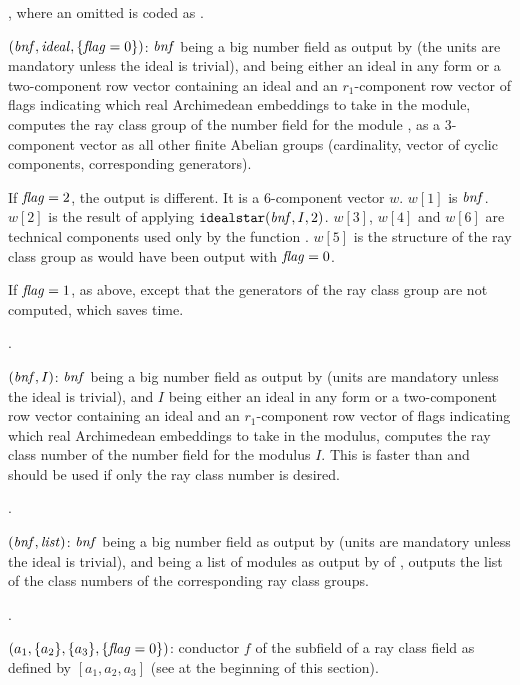 , where an omitted
 is coded as .

$(\hbox{\it bnf\/},\hbox{\it ideal\/},\{\hbox{\it f\kern0pt lag\/}=0\})$:
$\hbox{\it bnf\/}$ being a big number field
as output by  (the units are mandatory unless the ideal is
trivial), and  being either an ideal in any form or a two-component
row vector containing an ideal and an $r_1$-component row vector of flags
indicating which real Archimedean embeddings to take in the module, computes
the ray class group of the number field for the module , as a
3-component vector as all other finite Abelian groups (cardinality, vector of
cyclic components, corresponding generators).

If $\hbox{\it f\kern0pt lag\/}=2$, the output is different. It is a 6-component vector $w$. $w[1]$
is $\hbox{\it bnf\/}$. $w[2]$ is the result of applying
${\tt idealstar}(\hbox{\it bnf\/},I,2)$. $w[3]$, $w[4]$ and $w[6]$ are technical
components used only by the function . $w[5]$ is the
structure of the ray class group as would have been output with $\hbox{\it f\kern0pt lag\/}=0$.

If $\hbox{\it f\kern0pt lag\/}=1$, as above, except that the generators of the ray class group are
not computed, which saves time.

.

$(\hbox{\it bnf\/},I)$: $\hbox{\it bnf\/}$ being a big number field
as output
by  (units are mandatory unless the ideal is trivial), and $I$
being either an ideal in any form or a two-component row vector containing an
ideal and an $r_1$-component row vector of flags indicating which real
Archimedean embeddings to take in the modulus, computes the ray class number
of the number field for the modulus $I$. This is faster than 
and should be used if only the ray class number is desired.

.

$(\hbox{\it bnf\/},\hbox{\it list\/})$: $\hbox{\it bnf\/}$ being a
big number field as output by  (units are mandatory unless
the ideal is trivial), and  being a list of modules as output
by  of ,
outputs the list of the class numbers of the corresponding ray class groups.

.

$(a_1,\{a_2\},\{a_3\}, \{\hbox{\it f\kern0pt lag\/}=0\})$: conductor $f$ of
the subfield of a ray class field as defined by $[a_1,a_2,a_3]$ (see
 at the beginning of this section).

